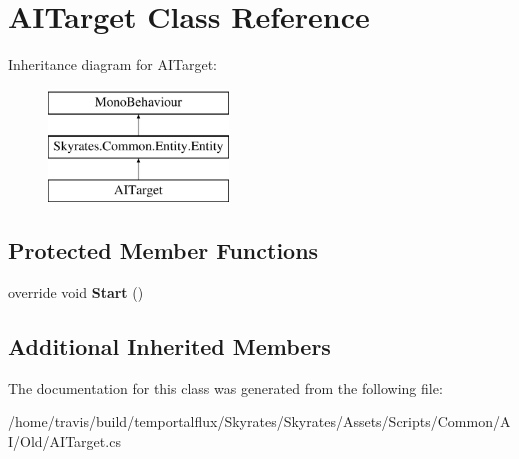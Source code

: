 \hypertarget{class_a_i_target}{\section{A\-I\-Target Class Reference}
\label{class_a_i_target}
}
Inheritance diagram for A\-I\-Target\-:\begin{figure}[H]
\begin{center}
\leavevmode
\includegraphics[height=3.000000cm]{class_a_i_target}
\end{center}
\end{figure}
\subsection*{Protected Member Functions}
\begin{DoxyCompactItemize}
\item 
\hypertarget{class_a_i_target_afa710ee550b6841bdfdf4a593d97a123}{override void {\bfseries Start} ()}\label{class_a_i_target_afa710ee550b6841bdfdf4a593d97a123}

\end{DoxyCompactItemize}
\subsection*{Additional Inherited Members}


The documentation for this class was generated from the following file\-:\begin{DoxyCompactItemize}
\item 
/home/travis/build/temportalflux/\-Skyrates/\-Skyrates/\-Assets/\-Scripts/\-Common/\-A\-I/\-Old/A\-I\-Target.\-cs\end{DoxyCompactItemize}
